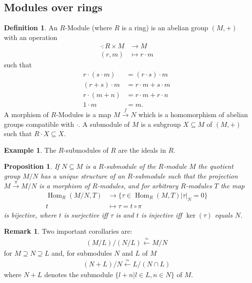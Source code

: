 \documentclass[DIV=14,parskip=half]{scrartcl}
\newtheorem{prop}{Proposition}[subsection]
\theoremstyle{definition}
\newtheorem{defi}{Definition}[subsection]
\newtheorem*{example}{Example}%
\newtheorem*{rem}{Remark}%
\newcommand{\Hom}{\operatorname{Hom}}
\newcommand{\longto}{\longrightarrow}
\newcommand{\longot}{\longleftarrow}
\begin{document}
\subsection{Modules over rings}
\begin{defi}\label{def:module}
 An $R$-Module (where $R$ is a ring) is an abelian group $(M,+)$ with an operation
 \begin{align*}
  \cdot: R\times M &\longto M\\
  (r,m) &\longmapsto r\cdot m
 \end{align*}
 such that
 \begin{align*}
  r\cdot(s\cdot m) &= (r\cdot s)\cdot m \\
  (r+s)\cdot m &= r\cdot m + s\cdot m\\
  r\cdot(m+n) &= r\cdot m +r\cdot n\\
  1\cdot m &= m.
 \end{align*}
A morphism of $R$-Modules is a map $M \overset{f}{\longto} N$ which is a homomorphism of abelian groups compatible with $\cdot$.
A submodule of $M$ is a subgroup $X\subseteq M$ of $(M,+)$ such that $R\cdot X \subseteq X$. 
\end{defi}
\begin{example} The $R$-submodules of $R$ are the ideals in $R$.
\end{example}
\begin{prop} If $N\subseteq M$ is a $R$-submodule of the $R$-module $M$ the quotient group $M/N$ has a unique structure of an $R$-submodule such that the projection $M\overset{\pi}{\longto} M/N$ is a morphism of $R$-modules, and for arbitrary $R$-modules $T$ the map  
\begin{align*}
 \Hom_R(M/N, T) &\longto \{\tau\in \Hom_R(M,T)| \tau|_N = 0\}\\
 t &\longmapsto \tau = t \circ \pi
\end{align*}
is bijective, where $t$ is surjective iff $\tau$ is and $t$ is injective iff $\ker(\tau)$ equals $N$.
\end{prop}
\begin{rem}
 Two important corollaries are:
 \begin{align*}
  (M/L)/(N/L) \overset{\simeq}{\longleftarrow} M/N
 \end{align*}
for $M\supseteq N \supseteq L$ and, for submodules $N$ and $L$ of $M$
\begin{align*}
 (N+L)/N \overset{\simeq}{\longot} L/(N\cap L)
\end{align*}
where $N+L$ denotes the submodule $\{l+n|l\in L, n\in N\}$ of $M$.
\end{rem}
\end{document}
